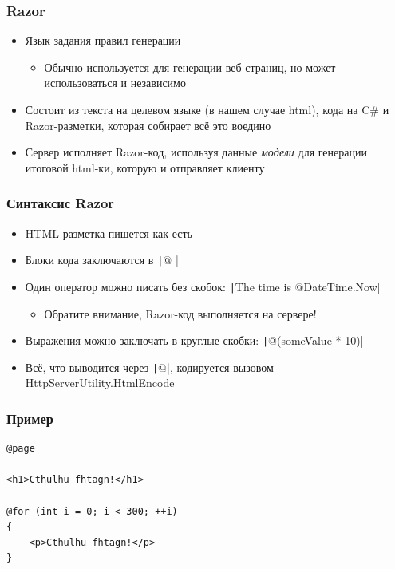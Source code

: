 \documentclass[xetex,mathserif,serif]{beamer}
\begin{document}
    \begin{frame}
        \frametitle{Razor}
        \begin{itemize}
            \item Язык задания правил генерации
            \begin{itemize}
                \item Обычно используется для генерации веб-страниц, но может использоваться и независимо
            \end{itemize}
            \item Состоит из текста на целевом языке (в нашем случае html), кода на C\# и Razor-разметки, которая собирает всё это воедино
            \item Сервер исполняет Razor-код, используя данные \textit{модели} для генерации итоговой html-ки, которую и отправляет клиенту
        \end{itemize}
    \end{frame}

    \begin{frame}
        \frametitle{Синтаксис Razor}
        \begin{itemize}
            \item HTML-разметка пишется как есть
            \item Блоки кода заключаются в \texttt|@{ }|
            \item Один оператор можно писать без скобок: \texttt|The time is @DateTime.Now|
            \begin{itemize}
                \item Обратите внимание, Razor-код выполняется на сервере!
            \end{itemize}
            \item Выражения можно заключать в круглые скобки: \texttt|@(someValue * 10)|
            \item Всё, что выводится через \texttt|@|, кодируется вызовом HttpServerUtility.HtmlEncode
        \end{itemize}
    \end{frame}

    \begin{frame}[fragile]
        \frametitle{Пример}
        \begin{verbatim}
@page

<h1>Cthulhu fhtagn!</h1>

@for (int i = 0; i < 300; ++i)
{
    <p>Cthulhu fhtagn!</p>
}
        \end{verbatim}
    \end{frame}
\end{document}
